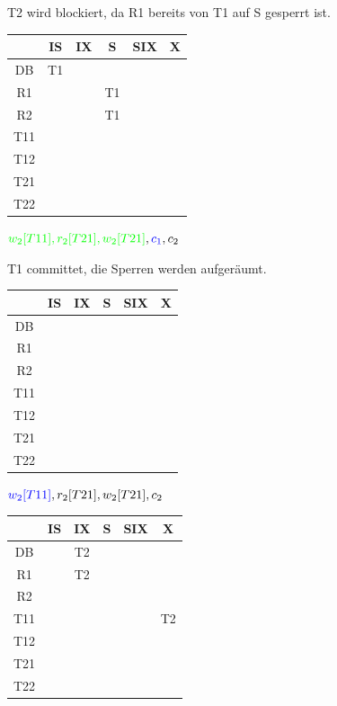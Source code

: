 \begin{note}
\begin{enumerate}[a)]
T2 wird blockiert, da R1 bereits von T1 auf S gesperrt ist.

\begin{tabular}{|c|c|c|c|c|c|}
	\hline
	& IS & IX & S & SIX & X \\
	\hline
	DB & T1 &  &  &  &  \\
	\hline
	R1 &  &  & T1 &  &  \\
	\hline
	R2 &  &  & T1 &  &  \\
	\hline
	T11 &  &  &  &  &  \\
	\hline
	T12 &  &  &  &  &  \\
	\hline
	T21 &  &  &  &  &  \\
	\hline
	T22 &  &  &  &  &  \\
	\hline
\end{tabular}

$\textcolor{green}{w_2[T11], r_2[T21], w_2[T21]}, \textcolor{blue}{c_1}, c_2$

T1 committet, die Sperren werden aufgeräumt.

\begin{tabular}{|c|c|c|c|c|c|}
	\hline
	& IS & IX & S & SIX & X \\
	\hline
	DB &  &  &  &  &  \\
	\hline
	R1 &  &  &  &  &  \\
	\hline
	R2 &  &  &  &  &  \\
	\hline
	T11 &  &  &  &  &  \\
	\hline
	T12 &  &  &  &  &  \\
	\hline
	T21 &  &  &  &  &  \\
	\hline
	T22 &  &  &  &  &  \\
	\hline
\end{tabular}

$\textcolor{blue}{w_2[T11]}, r_2[T21], w_2[T21], c_2$

\begin{tabular}{|c|c|c|c|c|c|}
	\hline
	& IS & IX & S & SIX & X \\
	\hline
	DB &  & T2 &  &  &  \\
	\hline
	R1 &  & T2 &  &  &  \\
	\hline
	R2 &  &  &  &  &  \\
	\hline
	T11 &  &  &  &  & T2 \\
	\hline
	T12 &  &  &  &  &  \\
	\hline
	T21 &  &  &  &  &  \\
	\hline
	T22 &  &  &  &  &  \\
	\hline
\end{tabular}


\end{enumerate}
\end{note}
